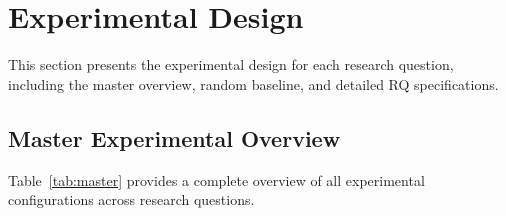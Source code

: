 \section{Experimental Design}
\label{sec:experimental_design}

This section presents the experimental design for each research question, including the master overview, random baseline, and detailed RQ specifications.

\subsection{Master Experimental Overview}

Table~\ref{tab:master} provides a complete overview of all experimental configurations across research questions.

